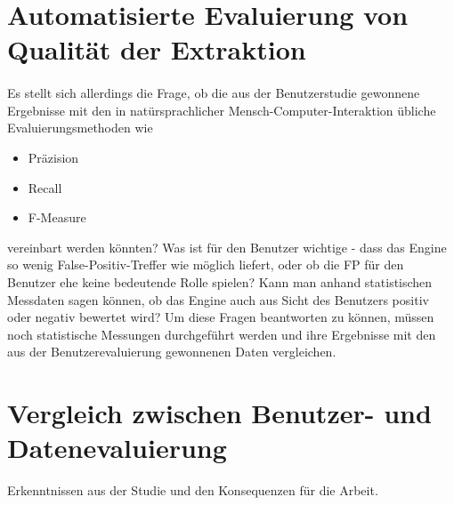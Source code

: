\section{Automatisierte Evaluierung von Qualität der Extraktion}
\paragraph{}
Es stellt sich allerdings die Frage, ob die aus der Benutzerstudie gewonnene Ergebnisse mit den in natürsprachlicher Mensch-Computer-Interaktion übliche Evaluierungsmethoden wie 
\begin{itemize}
\item Präzision
\item Recall
\item F-Measure
\end{itemize}
vereinbart werden könnten? Was ist für den Benutzer wichtige - dass das Engine so wenig False-Positiv-Treffer wie möglich liefert, oder ob die FP für den Benutzer ehe keine bedeutende Rolle spielen? Kann man anhand statistischen Messdaten sagen können, ob das Engine auch aus Sicht des Benutzers positiv oder negativ bewertet wird? Um diese Fragen beantworten zu können, müssen noch statistische Messungen durchgeführt werden und ihre Ergebnisse mit den aus der Benutzerevaluierung gewonnenen Daten vergleichen.

\section{Vergleich zwischen Benutzer- und Datenevaluierung}
Erkenntnissen aus der Studie und den Konsequenzen für die Arbeit.